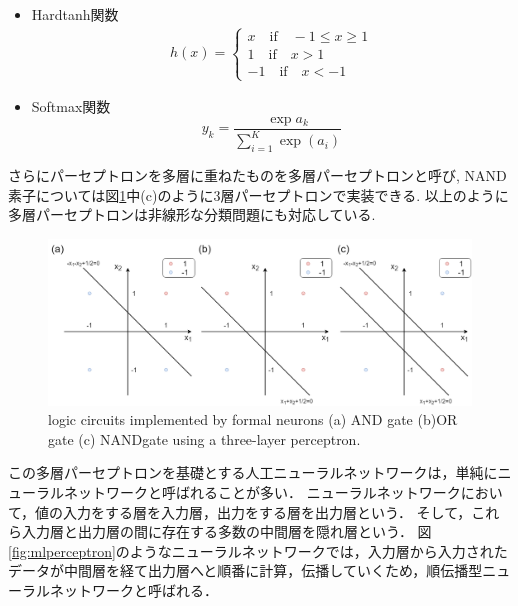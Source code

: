 \begin{itemize}
        \item Hardtanh関数
            \begin{align}
              h(x)= \begin{cases}
                        x \quad\text{if}\quad -1 \leq x \geq 1 \\
                        1 \quad\text{if}\quad x > 1 \\
                        -1 \quad\text{if}\quad x < -1
                    \end{cases}
            \end{align}
        \item Softmax関数
            \begin{equation}
                y_k = \frac{\exp{a_k}}{\sum^K_{i=1}\exp{\left(a_i\right)}}
            \end{equation}
    \end{itemize}

    さらにパーセプトロンを多層に重ねたものを多層パーセプトロンと呼び, NAND素子については図\ref{gate}中(c)のように3層パーセプトロンで実装できる.
    以上のように多層パーセプトロンは非線形な分類問題にも対応している.
    
    \begin{figure}[ht]
        \begin{center}
            \includegraphics[width=16.0cm]{./8_appendix/img/gate.png}
            \caption{logic circuits implemented by formal neurons (a) AND gate (b)OR gate (c) NANDgate using a three-layer perceptron.}
            \label{gate}
        \end{center}
    \end{figure}
    
    この多層パーセプトロンを基礎とする人工ニューラルネットワークは，単純にニューラルネットワークと呼ばれることが多い．
    ニューラルネットワークにおいて，値の入力をする層を入力層，出力をする層を出力層という．
    そして，これら入力層と出力層の間に存在する多数の中間層を隠れ層という．
    図\ref{fig:mlperceptron}のようなニューラルネットワークでは，入力層から入力されたデータが中間層を経て出力層へと順番に計算，伝播していくため，順伝播型ニューラルネットワークと呼ばれる．

